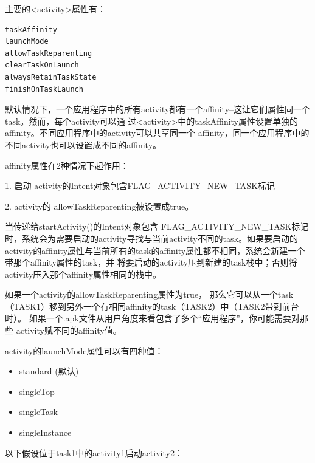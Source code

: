 \documentclass[a4paper, 11pt]{article}
\begin{document}
主要的<activity>属性有：
\begin{verbatim}
taskAffinity
launchMode
allowTaskReparenting
clearTaskOnLaunch
alwaysRetainTaskState
finishOnTaskLaunch
\end{verbatim}
默认情况下，一个应用程序中的所有activity都有一个affinity–这让它们属性同一个task。然而，每个activity可以通 过<activity>中的taskAffinity属性设置单独的affinity。不同应用程序中的activity可以共享同一个 affinity，同一个应用程序中的不同activity也可以设置成不同的affinity。

affinity属性在2种情况下起作用：

    1. 启动 activity的Intent对象包含FLAG_ACTIVITY_NEW_TASK标记

    2.  activity的 allowTaskReparenting被设置成true。 

当传递给startActivity()的Intent对象包含 FLAG_ACTIVITY_NEW_TASK标记时，系统会为需要启动的activity寻找与当前activity不同的task。如果要启动的 activity的affinity属性与当前所有的task的affinity属性都不相同，系统会新建一个带那个affinity属性的task，并 将要启动的activity压到新建的task栈中；否则将activity压入那个affinity属性相同的栈中。

如果一个activity的allowTaskReparenting属性为true， 那么它可以从一个task（TASK1）移到另外一个有相同affinity的task（TASK2）中（TASK2带到前台时）。
如果一个.apk文件从用户角度来看包含了多个“应用程序”，你可能需要对那些 activity赋不同的affinity值。

activity的launchMode属性可以有四种值：
\begin{itemize}
    \item standard (默认)
    \item singleTop
    \item singleTask
    \item singleInstance
\end{itemize}

以下假设位于task1中的activity1启动activity2：
\end{document}
